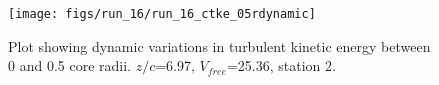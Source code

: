 \begin{figure}[H]
\centering
\texttt{[image: figs/run\_16/run\_16\_ctke\_05rdynamic]}
\caption{Plot showing dynamic variations in turbulent kinetic energy between 0 and 0.5 core radii. $z/c$=6.97, $V_{free}$=25.36, station 2.}
\label{fig:run_16_ctke_05rdynamic}
\end{figure}


